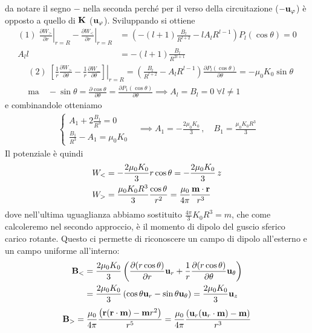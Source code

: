 da notare il segno $ - $ nella seconda perché per il verso della circuitazione ($ \mathbf{ -u }_{\varphi} $) è opposto a quello di $ \mathbf{ K } $ 
($ \mathbf{ u }_{\varphi} $). Sviluppando si ottiene
\begin{align}
  (1)\;\left. \frac{\partial W_> }{\partial r } \right|_{r=R} - \left. \frac{\partial W_< }{\partial r }\right|_{r=R} &= \left( -(l+1)\frac{B_l}{R^{l+2}} -lA_lR^{l-1} \right) P_l(\cos\theta) = 0 \\
   A_l l &= -(l+1) \frac{B_l}{R^{2l+1}}
\end{align}
\begin{align}
  &(2)\; \left. \left[ \frac{1}{r} \frac{\partial W_> }{\partial \theta } - \frac{1}{r} \frac{\partial W_- }{\partial \theta } \right]  \right|_{r=R} 
  = \left( \frac{B_l}{R^{l+2}} - A_l R^{l-1} \right)\frac{\partial P_l(\cos\theta) }{\partial \theta } = -\mu_0K_0\sin\theta\\
  &\text{ma} \quad -\sin\theta = \frac{\partial \cos\theta }{\partial \theta } = \frac{\partial P_1(\cos\theta) }{\partial \theta } \implies A_l = B_l = 0 \; \forall l\not= 1
\end{align}
e combinandole otteniamo
\begin{align}
    \begin{cases}
        A_1 +2 \frac{B_1}{R^{3}} = 0 \\
        \frac{B_1}{R^{3}} - A_1 = \mu_0K_0
    \end{cases}
    &\implies
    A_1 = - \frac{2\mu_0K_0}{3}  \, , \quad B_1 = \frac{\mu_0 K_0 R^3}{3} 
\end{align}
Il potenziale è quindi
\begin{align}
  W_< &= - \frac{2\mu_0K_0}{3} r \cos\theta = - \frac{2\mu_0K_0}{3} \,z\\
  W_> &= \frac{\mu_0 K_0 R^3}{3} \frac{\cos\theta }{r^2} = \frac{\mu_0}{4\pi} \frac{\mathbf{ m } \cdot \mathbf{ r }}{r^3}
\end{align}
dove nell'ultima uguaglianza abbiamo sostituito $ \frac{4\pi}{3}K_0R^3 = m $, che come calcoleremo nel secondo approccio, è il momento di dipolo del 
guscio sferico carico rotante. Questo ci permette di riconoscere un campo di dipolo all'esterno e un campo uniforme all'interno:
\begin{align}
  \mathbf{ B }_< &=  \frac{2\mu_0K_0}{3} \left( \frac{\partial (r \cos\theta) }{\partial r } \mathbf{ u }_r + \frac{1}{r} \frac{\partial (r\cos\theta) }{\partial \theta } \mathbf{ u }_{\theta}\right) \\
  &= \frac{2\mu_0K_0}{3} \left( \cos\theta \mathbf{ u }_r - \sin\theta \mathbf{ u }_{\theta} \right) = \frac{2\mu_0K_0}{3} \mathbf{ u }_z
\end{align}
\begin{align}
  \mathbf{ B }_> = \frac{\mu_0}{4\pi} \frac{\left( \mathbf{ r (r \cdot m) } - \mathbf{ m } r^2 \right)}{r^5} = \frac{\mu_0}{4\pi} \frac{\left( \mathbf{ u }_r (\mathbf{ u }_r \cdot \mathbf{ m }) - \mathbf{ m } \right)}{r^3}
\end{align}

